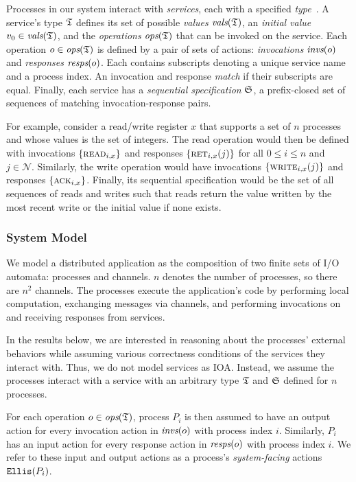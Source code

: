 Processes in our system interact with \textit{services}, each with a specified
\textit{type}~\cite{herlihy1990linearizability,lynch1996da}. A service's type
$\mathfrak{T}$ defines its set of possible \textit{values} $\operatorname*{\textit{vals}}(\mathfrak{T})$, an
\textit{initial value} $v_0 \in \operatorname*{\textit{vals}}(\mathfrak{T})$, and the \textit{operations}
$\operatorname*{\textit{ops}}(\mathfrak{T})$ that can be invoked on the service. Each operation $o \in
\operatorname*{\textit{ops}}(\mathfrak{T})$ is defined by a pair of sets of actions: \textit{invocations} $\operatorname*{\textit{invs}}(o)$ and
\textit{responses} $\operatorname*{\textit{resps}}(o)$. Each contains subscripts denoting a unique service name and a process index. An invocation and response \textit{match} if their subscripts are equal.
Finally, each service has a \textit{sequential specification} $\mathfrak{S}$, a
prefix-closed set of sequences of matching invocation-response pairs.

For example, consider a read/write register $x$ that supports a set of $n$
processes and whose values is the set of integers. The read operation would then
be defined with invocations $\{\textsc{read}_{i,x}\}$ and responses
$\{\textsc{ret}_{i,x}(j)\}$ for all $0 \leq i \leq n$ and $j \in \mathcal{N}$.
Similarly, the write operation would have invocations
$\{\textsc{write}_{i,x}(j)\}$ and responses $\{\textsc{ack}_{i,x}\}$. Finally,
its sequential specification would be the set of all sequences of reads and
writes such that reads return the value written by the most recent write or the
initial value if none exists.

\subsubsection{System Model}
\label{sec:equivalence:preliminaries:model}

We model a distributed application as the composition of two finite sets of I/O
automata: processes and channels. $n$ denotes the number of processes, so there are $n^2$ channels. The processes execute the application's code by performing local computation, exchanging messages via channels, and performing invocations on and receiving responses from services.

In the results below, we are interested in reasoning about the processes' external behaviors while assuming various correctness conditions of the services they interact with. Thus, we do not model services as IOA. Instead, we assume the processes interact with a service with an arbitrary type $\mathfrak{T}$ and $\mathfrak{S}$ defined for $n$ processes.

For each operation $o \in \operatorname*{\textit{ops}}(\mathfrak{T})$, process $P_i$ is then assumed to have an output action for every invocation action in $\operatorname*{\textit{invs}}(o)$ with process index $i$. Similarly, $P_i$ has an input action for every response action in $\operatorname*{\textit{resps}}(o)$ with process index $i$. We refer to these input and output actions as a process's \textit{system-facing} actions $\texttt{Ellis}(P_i)$.

